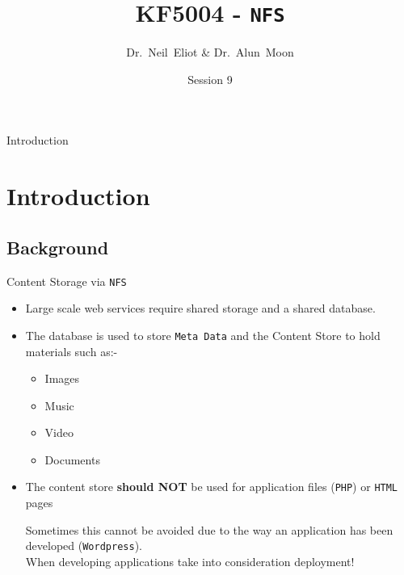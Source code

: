 \documentclass[xcolor=table]{beamer}
\title{KF5004 - \texttt{NFS}}
\author{Dr.~Neil~Eliot \& Dr.~Alun~Moon}
\institute[Northumbria University] %
{
  Department of Computer and Information Sciences\\
  University of Northumbria
}
\date{Session 9}
\begin{document}
\begin{frame}
  \titlepage
\end{frame}

\begin{frame}{Introduction}
  \tableofcontents
\end{frame}


\section{Introduction}
\subsection{Background}
\begin{frame}{Content Storage via \texttt{NFS}}
  \begin{itemize}
    \item Large scale web services require shared storage and a shared database.
    \item The database is used to store \texttt{Meta Data} and the Content Store to hold materials such as:-    
      \begin{itemize}
        \item Images
        \item Music
        \item Video
        \item Documents
      \end{itemize}
    \item The content store \textbf{should NOT} be used for application files (\texttt{PHP}) or \texttt{HTML} pages
      \begin{tcolorbox}
        \begin{center}
          \scriptsize Sometimes this cannot be avoided due to the way an application has been developed (\texttt{Wordpress}). \\When developing applications take into consideration deployment!
        \end{center}
      \end{tcolorbox}
  \end{itemize}
\end{frame}
\end{document}
